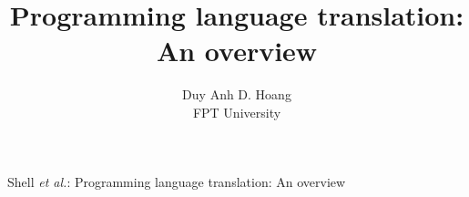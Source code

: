 \documentclass[journal]{IEEEtran}
\begin{document}
%
\title{Programming language translation:\\An overview}
%
%
%

\author{ 
    Duy Anh D. Hoang \\
    FPT University
}
% 
%



%
{Shell \MakeLowercase{\textit{et al.}}: Programming language translation: An overview}
% 
\end{document}
